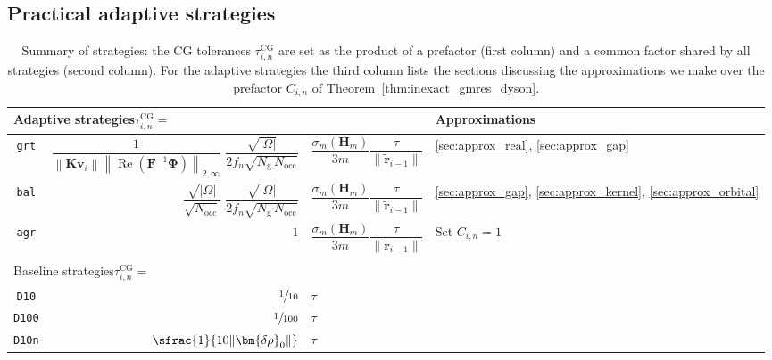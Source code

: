 \documentclass[hidelinks,onefignum,onetabnum]{siamart250211}
\newcommand{\Real}{\operatorname{Re}}
\newcommand{\Nocc}{N_{\mathrm{occ}}}
\newcommand{\Ng}{N_{\mathrm{g}}}
\newcommand{\taucg}{\tau^{\mathrm{CG}}}
\newcommand{\sbal}{\texttt{bal}\xspace}
\newcommand{\sagr}{\texttt{agr}\xspace}
\newcommand{\sgrt}{\texttt{grt}\xspace}
\newcommand{\sdten}{\texttt{D10}\xspace}
\newcommand{\sdhun}{\texttt{D100}\xspace}
\newcommand{\sdnorm}{\texttt{D10n}\xspace}
\begin{document}
\subsection{Practical adaptive strategies}
\label{sec:practical}
\begin{table}
  \newcommand{\rhsterm}{$\dfrac{\sigma_m(\bm H_m)}{3m} \dfrac{ \tau}{\|\widetilde{\bm r}_{i-1}\|}$}
  \centering
  \smaller
  \begin{tabular}{crll}
    \toprule
    \multicolumn{3}{l}{Adaptive strategies\quad$\taucg_{i,n} = $}&Approximations \\
    \midrule
    \sgrt     & $ \dfrac{1}{\left\| \bm K \bm v_i \right\| \left\| \Real(\bm{F}^{-1}\bm{\Phi}) \right\|_{2,\infty}}$
                $ \dfrac{\sqrt{|\Omega|}}{2 f_n \sqrt{\Ng \, \Nocc}}$
                & \rhsterm & \ref{sec:approx_real},  \ref{sec:approx_gap}\\[0.2em]
    \sbal     & $ \dfrac{\sqrt{|\Omega|}}{\sqrt{\Nocc}}$
    $ \dfrac{\sqrt{|\Omega|}}{2 f_n \sqrt{\Ng \, \Nocc}}$
    & \rhsterm & \ref{sec:approx_gap}, \ref{sec:approx_kernel}, \ref{sec:approx_orbital}\\[0.2em]
    \sagr     & $1$\hspace{2.5em} & \rhsterm & Set $C_{i,n}=1$ \\[0.4em]
    \bottomrule\\%
    \toprule
    \multicolumn{3}{l}{Baseline strategies\quad$\taucg_{i,n} = $} \\
    \midrule
    \sdten     & $ \sfrac{1}{10} $ & $\tau$\\[0.2em]
    \sdhun    & $\sfrac{1}{100} $ & $\tau$\\[0.2em]
    \sdnorm     & $\sfrac{1}{10 \|\bm{\delta \rho}_0\|} $ & $\tau$\\
    \bottomrule
  \end{tabular}
  \caption{Summary of strategies: the CG tolerances $\taucg_{i,n}$ are set as
      the product of a prefactor (first column)
      and a common factor shared by all strategies (second column).
      For the adaptive strategies the third column lists
      the sections discussing the approximations we make
      over the prefactor
      $C_{i,n}$ of Theorem~\ref{thm:inexact_gmres_dyson}.
  }
  \label{tab:strategies}
\end{table}
\end{document}
